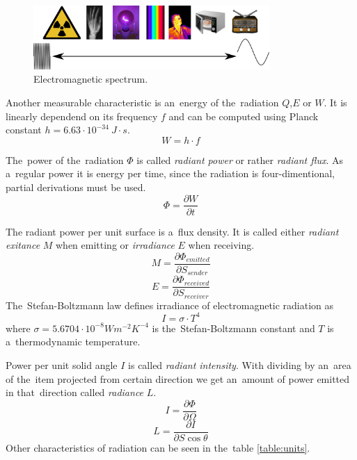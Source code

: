 \begin{figure}
\begin{center}
\includegraphics[width=0.8\textwidth]{obrazky-figures/spectrum.png}
\caption{Electromagnetic spectrum.\label{fig:spectrum}}
\end{center}    
\end{figure}

Another measurable characteristic is an~energy of the~radiation $Q$,$E$ or $W$. It is linearly dependend
on its frequency $f$ and can be computed using Planck constant $h=6.63\cdot10^{-34}~J\cdot s $.
\cite{NasaEMSpectrum}
$$W = h\cdot f$$

The~power of the~radiation $\Phi$ is called {\it radiant power} or rather {\it radiant flux}. As a~regular
power it is energy per time, since the radiation is four-dimentional, partial derivations must be used.
$$\Phi = \frac{\partial W}{\partial t}$$

The radiant power per unit surface is a~flux density. It is called either {\it radiant exitance} $M$
when emitting or {\it irradiance} $E$ when receiving.
$$M = \frac{\partial \Phi_{emitted}}{\partial S_{sender}}$$
$$E = \frac{\partial \Phi_{received}}{\partial S_{receiver}}$$
The~Stefan-Boltzmann law defines irradiance of electromagnetic radiation as
$$I = \sigma \cdot T^4$$
where $\sigma = 5.6704\cdot 10^{-8} Wm^{-2}K^{-4}$ is the~Stefan-Boltzmann constant and $T$ is a~thermodynamic
temperature.

Power per unit solid angle $I$ is called {\it radiant intensity}. With dividing by an~area of the~item
projected from certain direction we get an~amount of power emitted in that~direction called {\it radiance} $L$.
$$I = \frac{\partial \Phi}{\partial \Omega}$$
$$L = \frac{\partial I}{\partial S \cos{\theta}}$$ 
Other characteristics of radiation can be seen in the~table \ref{table:units}. \cite{iso800007} \cite{TemperatureMeasuring}

